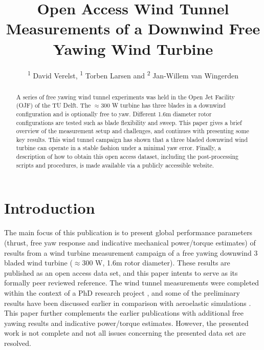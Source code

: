 \documentclass[a4paper]{jpconf}
\begin{document}
\title{Open Access Wind Tunnel Measurements of a Downwind Free Yawing Wind Turbine}

\author{\textsuperscript{1} David Verelst, \textsuperscript{1} Torben Larsen and \textsuperscript{2} Jan-Willem van Wingerden}

\address{\textsuperscript{1} DTU Wind Energy - Loads and Control, \textsuperscript{2} TU Delft - Delft Center for Systems and Control}




\begin{abstract}
A series of free yawing wind tunnel experiments was held in the Open Jet Facility (OJF) of the TU Delft. The $\approx 300$ W turbine has three blades in a downwind configuration and is optionally free to yaw. Different 1.6m diameter rotor configurations are tested such as blade flexibility and sweep. This paper gives a brief overview of the measurement setup and challenges, and continues with presenting some key results. This wind tunnel campaign has shown that a three bladed downwind wind turbine can operate in a stable fashion under a minimal yaw error. Finally, a description of how to obtain this open access dataset, including the post-processing scripts and procedures, is made available via a publicly accessible website.
\end{abstract}


\section{Introduction}

The main focus of this publication is to present global performance parameters (thrust, free yaw response and indicative mechanical power/torque estimates) of results from a wind turbine measurement campaign of a free yawing downwind 3 bladed wind turbine ($\approx 300$ W, 1.6m rotor diameter). These results are published as an open access data set, and this paper intents to serve as its formally peer reviewed reference. The wind tunnel measurements were completed within the context of a PhD research project
\cite{verelst_numerical_2013:diss}, and some of the preliminary results have been discussed earlier in comparison with aeroelastic simulations
\cite{verelst_wind_2014}. This paper further complements the earlier publications with additional free yawing results and indicative power/torque estimates. However, the presented work is not complete and not all issues concerning the presented data set are resolved. %
\end{document}
